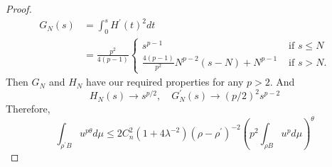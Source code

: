 \begin{enumerate}[label=\Roman*.]
\begin{proof}
\begin{equation*}
			\begin{array}{rlr}
				G_N(s) & =\int_0^s H^{\prime}(t)^2 d t \\
				& =\frac{p^2}{4(p-1)}\left\{
				\begin{array}{cc}
					s^{p-1} & \text { if } s \leq N \\
					\frac{4(p-1)}{p^2} N^{p-2}(s-N)+N^{p-1} & \text { if } s>N .
				\end{array}\right.
			\end{array}
		\end{equation*}
		Then $G_N$ and $H_N$ have our required properties for any $p > 2$. And
		\begin{equation*}
			H_N(s) \rightarrow s^{p / 2},\quad G_N^{\prime}(s) \rightarrow(p / 2)^2 s^{p-2}
		\end{equation*}
		Therefore,
		\begin{equation*}
			\int_{\rho^{\prime} B} u^{p \theta} d \mu \leq 2 C_n^2\left(1+4 \lambda^{-2}\right)\left(\rho-\rho^{\prime}\right)^{-2}\left(p^2 \int_{\rho B} u^p d \mu\right)^\theta
		\end{equation*}
	\end{proof}


\end{enumerate}
